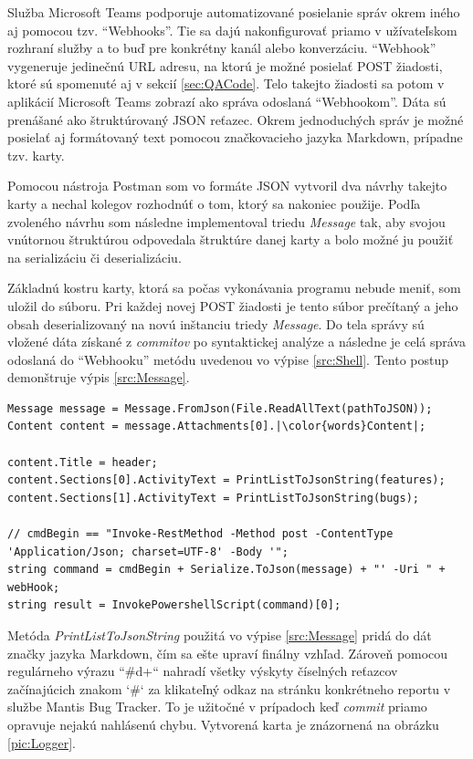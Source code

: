 \documentclass[slovak, bachelorpractice]{diploma}
\begin{document}
Služba Microsoft Teams podporuje automatizované posielanie správ okrem iného aj pomocou tzv. \enquote{Webhooks}. Tie sa dajú nakonfigurovať priamo v užívateľskom rozhraní služby a to buď pre konkrétny kanál alebo konverzáciu. \enquote{Webhook} vygeneruje jedinečnú URL adresu, na ktorú je možné posielať POST žiadosti, ktoré sú spomenuté aj v sekcií \ref{sec:QACode}. Telo takejto žiadosti sa potom v aplikácií Microsoft Teams zobrazí ako správa odoslaná \enquote{Webhookom}. Dáta sú prenášané ako štruktúrovaný JSON reťazec. Okrem jednoduchých správ je možné posielať aj formátovaný text pomocou značkovacieho jazyka Markdown, prípadne tzv. karty. 

Pomocou nástroja Postman som vo formáte JSON vytvoril dva návrhy takejto karty a nechal kolegov rozhodnúť o tom, ktorý sa nakoniec použije. Podľa zvoleného návrhu som následne implementoval triedu \textit{Message} tak, aby svojou vnútornou štruktúrou odpovedala štruktúre danej karty a bolo možné ju použiť na serializáciu či deserializáciu. 

Základnú kostru karty, ktorá sa počas vykonávania programu nebude meniť, som uložil do súboru. Pri každej novej POST žiadosti je tento súbor prečítaný a jeho obsah deserializovaný na novú inštanciu triedy \textit{Message}. Do tela správy sú vložené dáta získané z \textit{commitov} po syntaktickej analýze a následne je celá správa odoslaná do \enquote{Webhooku} metódu uvedenou vo výpise \ref{src:Shell}. Tento postup demonštruje výpis \ref{src:Message}. 
\vspace{10pt}
\begin{lstlisting}[label=src:Message,caption={Vytvorenie a odoslanie správy do služby Microsoft Teams}, escapechar={|}]
Message message = Message.FromJson(File.ReadAllText(pathToJSON));
Content content = message.Attachments[0].|\color{words}Content|;

content.Title = header;
content.Sections[0].ActivityText = PrintListToJsonString(features);
content.Sections[1].ActivityText = PrintListToJsonString(bugs);

// cmdBegin == "Invoke-RestMethod -Method post -ContentType 'Application/Json; charset=UTF-8' -Body '";
string command = cmdBegin + Serialize.ToJson(message) + "' -Uri " + webHook;
string result = InvokePowershellScript(command)[0];
\end{lstlisting}

Metóda \textit{PrintListToJsonString} použitá vo výpise  \ref{src:Message} pridá do dát značky jazyka Markdown, čím sa ešte upraví finálny vzhľad. Zároveň pomocou regulárneho výrazu \mbox{``\#\\d+``} nahradí všetky výskyty číselných reťazcov začínajúcich znakom `\#` za klikateľný odkaz na stránku konkrétneho reportu v službe Mantis Bug Tracker. To je užitočné v prípadoch keď \textit{commit} priamo opravuje nejakú nahlásenú chybu. Vytvorená karta je znázornená na obrázku \ref{pic:Logger}.
\end{document}
